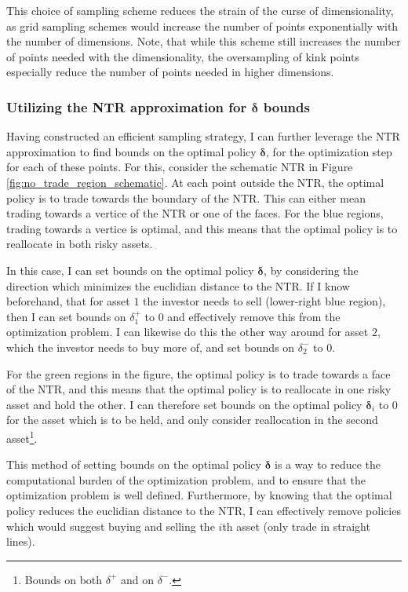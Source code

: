 \documentclass[11pt]{article}
\begin{document}
This choice of sampling scheme reduces the strain of the curse of dimensionality, as grid sampling schemes would increase the number of points exponentially with the number of dimensions.
Note, that while this scheme still increases the number of points needed with the dimensionality, the oversampling of kink points especially reduce the number of points needed in higher dimensions.


\subsubsection{Utilizing the NTR approximation for $\boldsymbol{\delta}$ bounds} \label{Subsubsection: NTR-deltabounds}
Having constructed an efficient sampling strategy, I can further leverage the \ac{NTR} approximation to find bounds on the optimal policy $\boldsymbol{\delta}$,
for the optimization step for each of these points. For this, consider the schematic \ac{NTR} in Figure \ref{fig:no_trade_region_schematic}.
At each point outside the NTR, the optimal policy is to trade towards the boundary of the NTR. This can either mean trading towards a vertice of the \ac{NTR} or one of the faces.
For the blue regions, trading towards a vertice is optimal, and this means that the optimal policy is to reallocate in both risky assets.

In this case, I can set bounds on the optimal policy $\boldsymbol{\delta}$, by considering the direction which minimizes the euclidian distance to the \ac{NTR}.
If I know beforehand, that for asset $1$ the investor needs to sell (lower-right blue region), then I can set bounds on $\delta_{1}^{+}$ to $0$ and effectively remove this from the optimization problem.
I can likewise do this the other way around for asset $2$, which the investor needs to buy more of, and set bounds on $\delta_{2}^{-}$ to $0$.

For the green regions in the figure, the optimal policy is to trade towards a face of the \ac{NTR}, and this means that the optimal policy is to reallocate in one risky asset and hold the other.
I can therefore set bounds on the optimal policy $\boldsymbol{\delta}_{i}$ to $0$ for the asset which is to be held, and only consider reallocation in the second asset\footnote{Bounds on both $\delta^{+}$ and on $\delta^{-}$.}.

This method of setting bounds on the optimal policy $\boldsymbol{\delta}$ is a way to reduce the computational burden of the optimization problem, and to ensure that the optimization problem is well defined.
Furthermore, by knowing that the optimal policy reduces the euclidian distance to the \ac{NTR}, I can effectively remove policies which would suggest buying and selling the $i$th asset (only trade in straight lines). 
\end{document}
